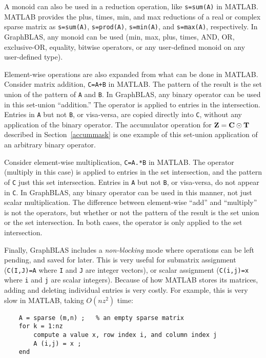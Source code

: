 \documentclass[12pt]{article}
\begin{document}
A monoid can also be used in a reduction operation, like \verb's=sum(A)' in
MATLAB.  MATLAB provides the plus, times, min, and max reductions of a real or
complex sparse matrix as \verb's=sum(A)',  \verb's=prod(A)', \verb's=min(A)',
and \verb's=max(A)', respectively.  In GraphBLAS, any monoid can be used (min,
max, plus, times, AND, OR, exclusive-OR, equality, bitwise operators,
or any user-defined monoid on any user-defined type).

Element-wise operations are also expanded from what can be done in MATLAB.
Consider matrix addition, \verb'C=A+B' in MATLAB.  The pattern of the result is
the set union of the pattern of \verb'A' and \verb'B'.  In GraphBLAS, any
binary operator can be used in this set-union ``addition.''  The operator is
applied to entries in the intersection.  Entries in \verb'A' but not \verb'B',
or visa-versa, are copied directly into \verb'C', without any application of
the binary operator.  The accumulator operation for ${\bf Z = C \odot T}$
described in Section~\ref{accummask} is one example of this set-union
application of an arbitrary binary operator.

Consider element-wise multiplication, \verb'C=A.*B' in MATLAB.  The operator
(multiply in this case) is applied to entries in the set intersection, and the
pattern of \verb'C' just this set intersection.  Entries in \verb'A' but not
\verb'B', or visa-versa, do not appear in \verb'C'.  In GraphBLAS, any binary
operator can be used in this manner, not just scalar multiplication.  The
difference between element-wise ``add'' and ``multiply'' is not the operators,
but whether or not the pattern of the result is the set union or the set
intersection.  In both cases, the operator is only applied to the set
intersection.

Finally, GraphBLAS includes a {\em non-blocking} mode where operations can be
left pending, and saved for later.  This is very useful for submatrix
assignment (\verb'C(I,J)=A' where \verb'I' and \verb'J' are integer vectors),
or scalar assignment (\verb'C(i,j)=x' where \verb'i' and \verb'j' are scalar
integers).  Because of how MATLAB stores its matrices, adding and deleting
individual entries is very costly.  For example, this is very slow in MATLAB,
taking $O(nz^2)$ time:

    \begin{mdframed}
    {\footnotesize
    \begin{verbatim}
    A = sparse (m,n) ;   % an empty sparse matrix
    for k = 1:nz
        compute a value x, row index i, and column index j
        A (i,j) = x ;
    end\end{verbatim}}\end{mdframed}
\end{document}
